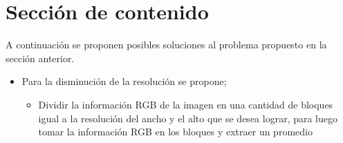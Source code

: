 \documentclass{article}
\begin{document}
\section{Sección de contenido} \label{contenido}
A continuación se proponen posibles soluciones al problema propuesto en la sección anterior.
\begin{itemize}
    \item Para la disminución de la resolución se propone;
    \begin{itemize}
        \item Dividir la información RGB de la imagen en una cantidad de bloques igual a la resolución del ancho y el alto que se desea lograr, para luego tomar la información RGB en los bloques y extraer un promedio  
    \end{itemize}
\end{itemize}
\end{document}
